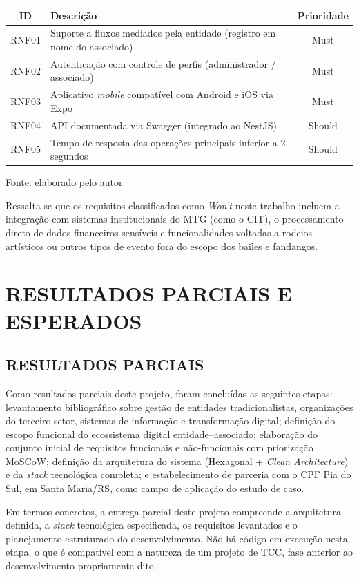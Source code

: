 ﻿\documentclass[12pt,a4paper]{article}
\newcommand{\fonte}[1]{\par\vspace{2pt}\footnotesize{Fonte: #1}}
\begin{document}
\begin{center}
\label{tab:rnf}
\begin{tabular}{clc}
\hline
\textbf{ID} & \textbf{Descrição} & \textbf{Prioridade} \\
\hline
RNF01 & Suporte a fluxos mediados pela entidade (registro em nome do associado) & Must \\
RNF02 & Autenticação com controle de perfis (administrador / associado) & Must \\
RNF03 & Aplicativo \textit{mobile} compatível com Android e iOS via Expo & Must \\
RNF04 & API documentada via Swagger (integrado ao NestJS) & Should \\
RNF05 & Tempo de resposta das operações principais inferior a 2 segundos & Should \\
\hline
\end{tabular}
\fonte{elaborado pelo autor}
\end{center}

Ressalta-se que os requisitos classificados como \textit{Won't} neste trabalho incluem a integração com sistemas institucionais do MTG (como o CIT), o processamento direto de dados financeiros sensíveis e funcionalidades voltadas a rodeios artísticos ou outros tipos de evento fora do escopo dos bailes e fandangos.

\section{RESULTADOS PARCIAIS E ESPERADOS}

\subsection{RESULTADOS PARCIAIS}

Como resultados parciais deste projeto, foram concluídas as seguintes etapas: levantamento bibliográfico sobre gestão de entidades tradicionalistas, organizações do terceiro setor, sistemas de informação e transformação digital; definição do escopo funcional do ecossistema digital entidade--associado; elaboração do conjunto inicial de requisitos funcionais e não-funcionais com priorização MoSCoW; definição da arquitetura do sistema (Hexagonal + \textit{Clean Architecture}) e da \textit{stack} tecnológica completa; e estabelecimento de parceria com o CPF Pia do Sul, em Santa Maria/RS, como campo de aplicação do estudo de caso.

Em termos concretos, a entrega parcial deste projeto compreende a arquitetura definida, a \textit{stack} tecnológica especificada, os requisitos levantados e o planejamento estruturado do desenvolvimento. Não há código em execução nesta etapa, o que é compatível com a natureza de um projeto de TCC, fase anterior ao desenvolvimento propriamente dito.
\end{document}
